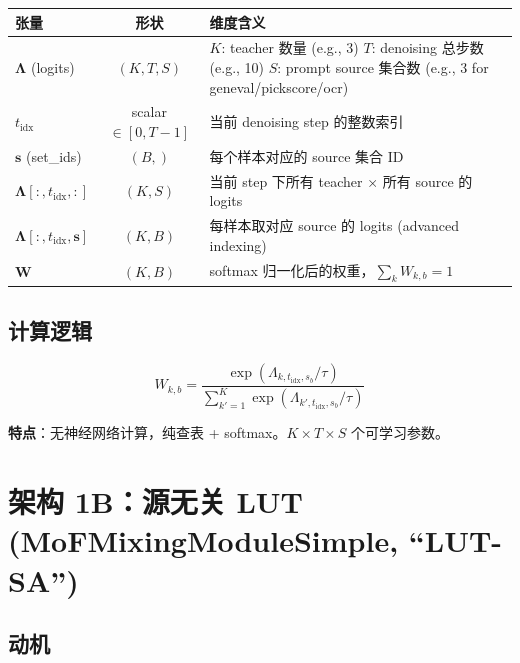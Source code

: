 \documentclass[11pt,a4paper]{article}
\begin{document}
\begin{center}
\begin{tabular}{lcp{8cm}}
\toprule
\textbf{张量} & \textbf{形状} & \textbf{维度含义} \\
\midrule
$\bm{\Lambda}$ (logits) & $(K, T, S)$ &
    $K$: teacher 数量 (e.g., 3) \newline
    $T$: denoising 总步数 (e.g., 10) \newline
    $S$: prompt source 集合数 (e.g., 3 for geneval/pickscore/ocr) \\
\midrule
$t_{\text{idx}}$ & scalar $\in [0, T{-}1]$ & 当前 denoising step 的整数索引 \\
\midrule
$\mathbf{s}$ (set\_ids) & $(B,)$ & 每个样本对应的 source 集合 ID \\
\midrule
$\bm{\Lambda}[:, t_{\text{idx}}, :]$ & $(K, S)$ & 当前 step 下所有 teacher × 所有 source 的 logits \\
\midrule
$\bm{\Lambda}[:, t_{\text{idx}}, \mathbf{s}]$ & $(K, B)$ & 每样本取对应 source 的 logits (advanced indexing) \\
\midrule
$\mathbf{W}$ & $(K, B)$ & softmax 归一化后的权重，$\sum_k W_{k,b} = 1$ \\
\bottomrule
\end{tabular}
\end{center}

\subsection{计算逻辑}

\begin{equation}
W_{k,b} = \frac{\exp(\Lambda_{k, t_{\text{idx}}, s_b} / \tau)}{\sum_{k'=1}^K \exp(\Lambda_{k', t_{\text{idx}}, s_b} / \tau)}
\end{equation}

\textbf{特点}：无神经网络计算，纯查表 + softmax。$K \times T \times S$ 个可学习参数。

\section{架构 1B：源无关 LUT (MoFMixingModuleSimple, ``LUT-SA'')}
\label{sec:lut_sa}

\subsection{动机}
\end{document}
